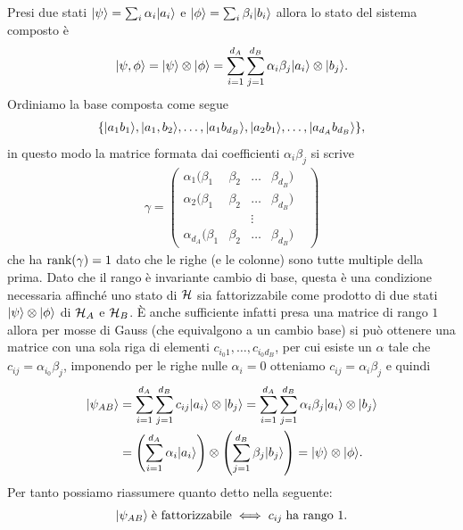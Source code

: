 Presi due stati $ \vert \psi \rangle = \sum_i \alpha_i \vert a_i \rangle $ e $ \k{\phi} = \sum_i \beta_i \k{b_i} $ allora lo stato del sistema composto è 
\begin{align*}
  \k{\psi,\phi} = \k{\psi} \otimes \k{\phi} = \sum_{i=1}^{d_A} \sum_{j = 1}^{d_B} \alpha_i\beta_j \k{a_i} \otimes \k{b_j}.
\end{align*}
Ordiniamo la base composta come segue
\begin{align*}
  \{\vert a_1b_1 \rangle, \vert a_1,b_2 \rangle, \dots , \vert a_1b_{d_B} \rangle, \vert a_2b_1 \rangle, \dots, \vert a_{d_A}b_{d_B} \rangle\},
\end{align*}
in questo modo la matrice formata dai coefficienti $ \alpha_i \beta_j $ si scrive 
\begin{align*}
  \gamma = 
  \begin{pmatrix}
    \alpha_1 (\beta_1 & \beta_2 & \dots & \beta_{d_B}) \\
    \alpha_2 (\beta_1 & \beta_2 & \dots & \beta_{d_B}) \\
     & & \vdots & & \\
    \alpha_{d_A} (\beta_1 & \beta_2 & \dots & \beta_{d_B}) 
  \end{pmatrix}
\end{align*}
che ha $ \operatorname{\textnormal{rank}} (\gamma) = 1 $ dato che le righe (e le colonne) sono tutte multiple della prima. Dato che il rango è invariante cambio di base, 
questa è una condizione necessaria affinché uno stato di $ \operatorname{\mathcal{H}} $ sia fattorizzabile come prodotto di due stati $ \k{\psi} \otimes \k{\phi} $ di 
$ \operatorname{\mathcal{H}}_A $ e $ \operatorname{\mathcal{H}}_B $. È anche sufficiente infatti presa una matrice di rango $ 1 $ allora per mosse di Gauss (che equivalgono a un cambio base) 
si può ottenere una matrice con una sola riga di elementi $ c_{i_0 1}, \dots, c_{i_0 d_B} $, per cui esiste un 
$ \alpha $ tale che $ c_{ij} = \alpha_{i_0} \beta_j $, 
imponendo per le righe nulle $ \alpha_i = 0 $ otteniamo $ c_{ij} = \alpha_i \beta_j $ e quindi 
\begin{align*}
  \k{\psi_{AB}} &= \sum_{i=1}^{d_A} \sum_{j = 1}^{d_B} c_{ij} \k{a_i} \otimes \k{b_j} 
  = \sum_{i=1}^{d_A} \sum_{j = 1}^{d_B} \alpha_i \beta_j \k{a_i} \otimes \k{b_j} 
  \\
  &= \left( \sum_{i=1}^{d_A} \alpha_i \k{a_i} \right) \otimes \left( \sum_{j = 1}^{d_B} \beta_j \k{b_j} \right) = \k{\psi} \otimes \k{\phi}.
\end{align*}
Per tanto possiamo riassumere quanto detto nella seguente:
\begin{align*}
  \vert \psi_{AB} \rangle \; \text{è fattorizzabile} \iff c_{ij} \; \text{ha rango 1}.
\end{align*}
